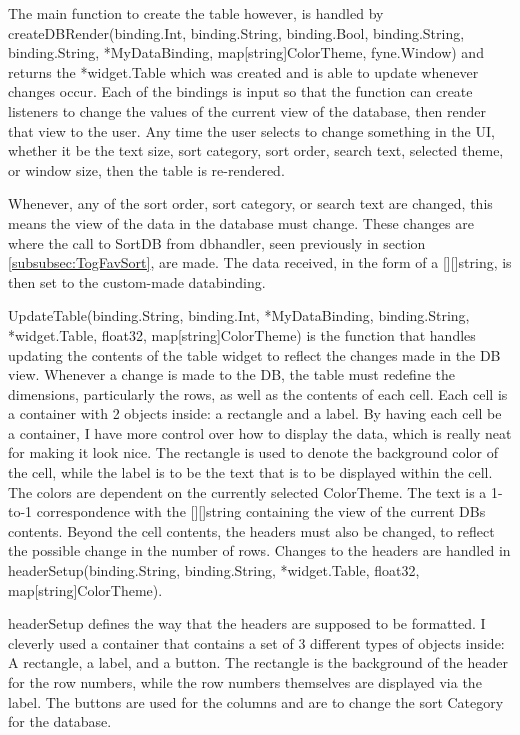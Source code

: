The main function to create the table however, is handled by
createDBRender(binding.Int, binding.String, binding.Bool,
	binding.String, binding.String, *MyDataBinding,
map[string]ColorTheme, fyne.Window) and returns the *widget.Table
which was created and is able to update whenever changes occur.
Each of the bindings is input so that the function can create
listeners to change the values of the current view of the database,
then render that view to the user. Any time the user selects to
change something in the UI, whether it be the text size, sort
category, sort order, search text, selected theme, or window size,
then the table is re-rendered.

Whenever, any of the sort order, sort category, or search text are
changed, this means the view of the data in the database must change.
These changes are where the call to SortDB from dbhandler, seen
previously in section \ref{subsubsec:TogFavSort}, are made. The data
received, in the form of a [][]string, is then set to the custom-made
databinding.

UpdateTable(binding.String, binding.Int, *MyDataBinding,
binding.String, *widget.Table, float32, map[string]ColorTheme) is the
function that handles updating the contents of the table widget to
reflect the changes made in the DB view.
Whenever a change is made to the DB, the table must redefine the
dimensions, particularly the rows, as well as the contents of each
cell. Each cell is a container with 2 objects inside: a rectangle and
a label. By having each cell be a container, I have more control over
how to display the data, which is really neat for making it look
nice. The rectangle is used to denote the background color of the
cell, while the label is to be the text that is to be displayed
within the cell. The colors are dependent on the currently selected
ColorTheme. The text is a 1-to-1 correspondence with the [][]string
containing the view of the current DBs contents. Beyond the cell contents,
the headers must also be changed, to reflect the possible
change in the number of rows. Changes to the headers are handled in
headerSetup(binding.String, binding.String, *widget.Table, float32,
map[string]ColorTheme).

headerSetup defines the way that the headers are supposed to
be formatted. I cleverly used a container that contains a set of 3
different types of objects inside: A rectangle, a label, and a button.
The rectangle is the background of the header for the row numbers,
while the row numbers themselves are displayed via the label. The
buttons are used for the columns and are to change the sort Category
for the database.

